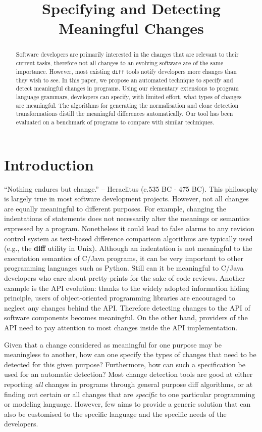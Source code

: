 \documentclass[10pt, conference, compsocconf]{IEEEtran}
\title{Specifying and Detecting Meaningful Changes}
\author{\IEEEauthorblockN{
Yijun Yu\IEEEauthorrefmark{1},
Thein Than Tun\IEEEauthorrefmark{1} and
Bashar Nuseibeh\IEEEauthorrefmark{1} \IEEEauthorrefmark{2}}
\IEEEauthorblockA{\IEEEauthorrefmark{1}
The Open University\\
Milton Keynes, UK\\
Email: \{t.t.tun, y.yu, b.nuseibeh\}@open.ac.uk}
\IEEEauthorblockA{\IEEEauthorrefmark{2}
Lero,  Irish Software Engineering Research Centre\\
Limerick, Ireland\\
Email: bashar.nuseibeh@lero.ie}}
\begin{document}
\maketitle
\begin{abstract}
Software developers are primarily interested in the changes that are relevant to their current tasks, therefore not all changes to an evolving software are of the same importance. However, most existing {\tt diff} tools notify developers more changes than they wish to see.  In this paper, we propose an automated technique to specify and detect meaningful changes in programs. 
Using our elementary extensions to program language grammars, developers can specify, with limited effort, what types of changes are meaningful. The algorithms for generating the normalisation and clone detection transformations distill the meaningful differences automatically. Our tool has been evaluated on a benchmark of programs to compare with similar techniques.
\end{abstract}
\section{Introduction}

``Nothing endures but change.'' -- Heraclitus (c.535 BC - 475 BC). This philosophy is largely true in most software development projects. However, not all changes are equally meaningful to different purposes. For example, changing the indentations of statements does not necessarily alter the meanings or semantics expressed by a program. Nonetheless it could lead to false alarms to any revision control system as text-based difference comparison algorithms are typically used (e.g., the {\bf diff} utility in Unix). Although an indentation is not meaningful to the executation semantics of C/Java programs, it can be very important to other programming languages such as Python. Still can it be meaningful to C/Java developers who care about pretty-prints for the sake of code reviews. Another example is the API evolution: thanks to the widely adopted information hiding principle, users of object-oriented programming libraries are encouraged to neglect any changes behind the API. Therefore detecting changes to the API of software components becomes meaningful. On the other hand, providers of the API need to pay attention to most changes inside the API implementation. 

Given that a change considered as meaningful for one purpose may be meaningless to another, how can one specify the types of changes that need to be detected for this given purpose? Furthermore, how can such a specification be used for an automatic detection? Most change detection tools are good at either reporting {\em all} changes in programs through general purpose diff algorithms, or at finding out certain or all changes that are {\em specific} to one particular programming or modeling language. However, few aims to provide a generic solution that can also be customised to the specific language and the specific needs of the developers.
\end{document}
